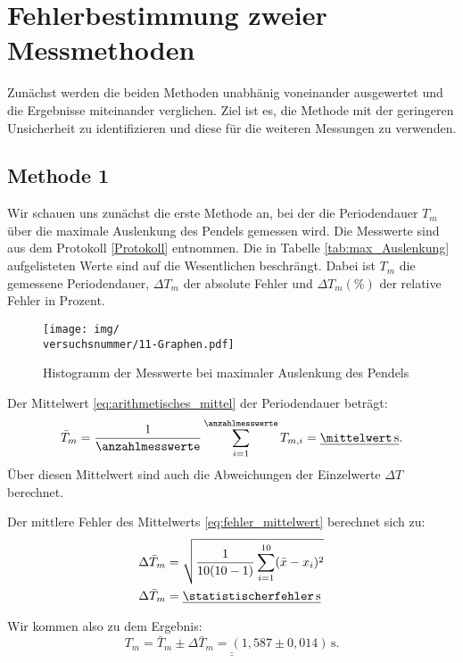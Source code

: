 \twocolumn

\section{Fehlerbestimmung zweier Messmethoden}
Zunächst werden die beiden Methoden unabhänig voneinander ausgewertet und die Ergebnisse miteinander verglichen. Ziel ist es, die Methode mit der geringeren Unsicherheit zu identifizieren und diese für die weiteren Messungen zu verwenden.
\subsection*{Methode 1}
Wir schauen uns zunächst die erste Methode an, bei der die Periodendauer $T_{m}$ über die maximale Auslenkung des Pendels gemessen wird. Die Messwerte sind aus dem Protokoll \ref{Protokoll} entnommen. Die in Tabelle \ref{tab:max_Auslenkung} aufgelisteten Werte sind auf die Wesentlichen beschrängt.
Dabei ist $T_{m}$ die gemessene Periodendauer, $\Delta T_{m}$ der absolute Fehler und $\Delta T_{m} (\%)$ der relative Fehler in Prozent.
\messwertetabelle

\begin{figure}[h!]
    \centering
    \texttt{[image: img/\\versuchsnummer/11-Graphen.pdf]}
    \caption{Histogramm der Messwerte bei maximaler Auslenkung des Pendels}
    \label{fig:histogramm_max_auslenkung}
\end{figure}



\vspace{2pt}
Der Mittelwert \eqref{eq:arithmetisches_mittel} der Periodendauer beträgt:
\begin{equation}
    \bar{T}_{m} = \frac{1}{\anzahlmesswerte}\sum_{i=1}^{\anzahlmesswerte} T_{m,i} = \underline{\mittelwert\,\mathrm{s}}.
\end{equation}
Über diesen Mittelwert  sind auch die Abweichungen der Einzelwerte $\Delta T$ berechnet.

Der mittlere Fehler des Mittelwerts \eqref{eq:fehler_mittelwert} berechnet sich zu:
\begin{align}
    \Delta \bar{T}_{m} &= \sqrt{\frac{1}{10(10-1)} \sum_{i=1}^{10} (\bar{x}-x_i)^2}  \\
    \Delta \bar{T}_{m} &= \underline{\statistischerfehler\,\mathrm{s}}
\end{align}

Wir kommen also zu dem Ergebnis:
\begin{equation}
    \underline{\underline{T_{m} = \bar{T}_{m} \pm \Delta \bar{T}_{m} = (1,587 \pm 0,014)\,\mathrm{s}.}}
\end{equation}

